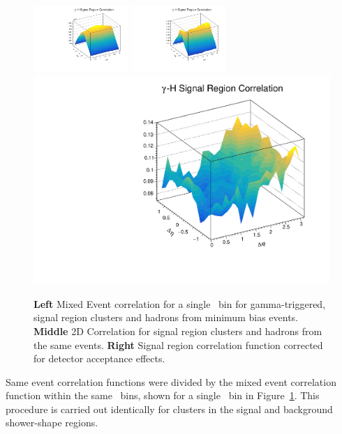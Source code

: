 \begin{figure}
\includegraphics[width=0.32\textwidth]{G-H_New/2D_SR_ME.pdf}
\includegraphics[width=0.32\textwidth]{G-H_New/2D_SR_SE.pdf}
\includegraphics[width = 0.32 \textwidth]{G-H_New/2D_SR.pdf}
\caption{\textbf{Left} Mixed Event correlation for a single \zt~bin for gamma-triggered, signal region clusters and hadrons from minimum bias events. \textbf{Middle} 2D Correlation for signal region clusters and hadrons from the same events. \textbf{Right} Signal region correlation function corrected for detector acceptance effects.}
\label{fig:SR_2D}
\end{figure}

Same event correlation functions were divided by the mixed event correlation function within the same \zt~bins, shown for a single \zt~bin in Figure~\ref{fig:SR_2D}. This procedure is carried out identically for clusters in the signal and background shower-shape regions. 







